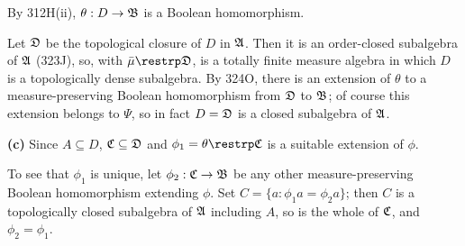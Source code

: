 {By 312H(ii), $\theta:D\to\frak B$ is a Boolean homomorphism.
     
\medskip
     
 Let $\frak D$ be the topological closure of $D$ in
$\frak A$.   Then it is an order-closed subalgebra of $\frak A$ (323J),
so, with $\bar\mu\restrp\frak D$, is a totally finite measure algebra in
which $D$ is a topologically dense subalgebra.   By 324O, there is an
extension of $\theta$ to a measure-preserving Boolean homomorphism from
$\frak D$ to $\frak B$;  of course this extension belongs to $\Psi$, so
in fact $D=\frak D$ is a closed subalgebra of $\frak A$.
     
\medskip
     
{\bf (c)} Since $A\subseteq D$, $\frak C\subseteq\frak D$ and
$\phi_1=\theta\restrp\frak C$ is a suitable extension of $\phi$.
     
To see that $\phi_1$ is unique, let $\phi_2:\frak C\to\frak B$ be any
other measure-preserving Boolean homomorphism extending $\phi$.   Set
$C=\{a:\phi_1a=\phi_2a\}$;  then $C$ is a topologically closed
subalgebra of $\frak A$ including $A$, so is the whole of $\frak C$, and
$\phi_2=\phi_1$.
}%
     
